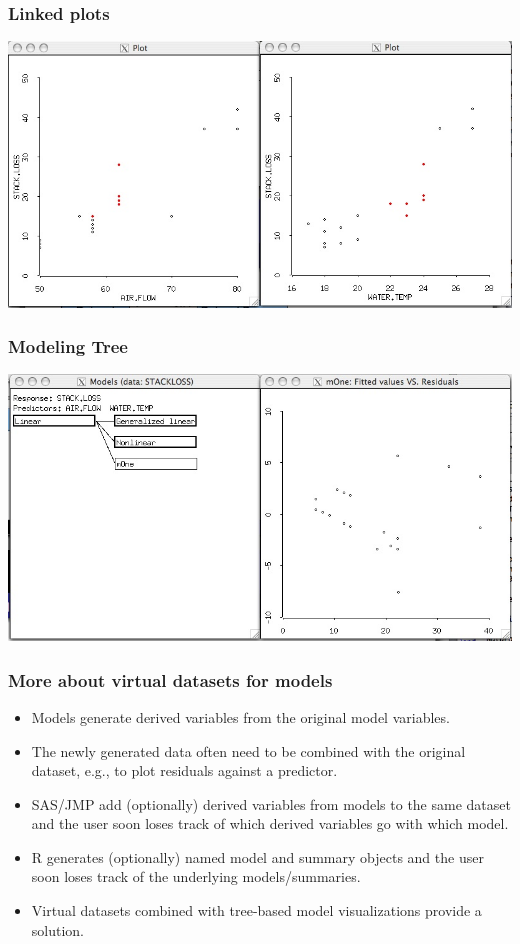 \documentclass{beamer}
\begin{document}
\begin{frame}
\frametitle{Linked plots}
\includegraphics[width=\textwidth]{linkedPlots.jpg}
\end{frame}

\begin{frame}
\frametitle{Modeling Tree}
\includegraphics[width=\textwidth]{modeling.jpg}
\end{frame}

\begin{frame}
\frametitle{More about virtual datasets for models}
\begin{itemize}
	\item Models generate derived variables from the original model variables.
	\item The newly generated data often need to be combined with the original dataset, e.g., to plot residuals against a predictor.
	\item SAS/JMP add (optionally) derived variables from models to the same dataset and the user soon loses track of which derived variables go with which model.
	\item R generates (optionally) named model and summary objects and the user soon loses track of the underlying models/summaries.
	\item Virtual datasets combined with tree-based model visualizations provide a solution.
\end{itemize}
\end{frame}
\end{document}
